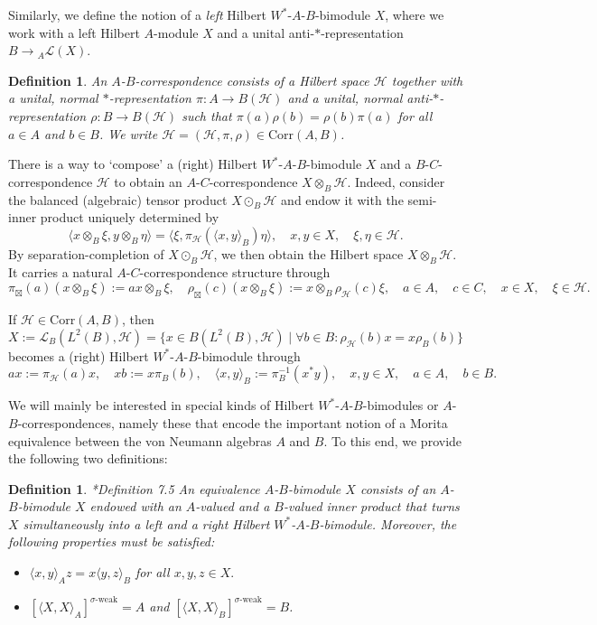 \documentclass[reqno]{amsart}
\numberwithin{equation}{section}
\newtheorem{Def}[Theorem]{Definition}
\newcommand{\Corr}{\mathrm{Corr}}
\begin{document}
Similarly, we define the notion of a \emph{left} Hilbert $W^*$-$A$-$B$-bimodule $X$, where we work with a left Hilbert $A$-module $X$ and a unital anti-$*$-representation $B \to {}_A\mathscr{L}(X)$.

\begin{Def}\cite{Con80+}\label{correspondence_definition}
    An $A$-$B$-correspondence consists of a Hilbert space $\mathcal{H}$ together with a unital, normal $*$-representation $\pi: A \to B(\mathcal{H})$ and a unital, normal anti-$*$-representation $\rho: B \to B(\mathcal{H})$ such that $\pi(a)\rho(b) = \rho(b)\pi(a)$ for all $a\in A$ and $b\in B$. We write $\mathcal{H}= (\mathcal{H}, \pi, \rho)\in \Corr(A,B)$.
\end{Def}

There is a way to `compose' a (right) Hilbert $W^*$-$A$-$B$-bimodule $X$ and a $B$-$C$-correspondence $\mathcal{H}$ to obtain an $A$-$C$-correspondence $X \otimes_B \mathcal{H}$. Indeed, consider the balanced (algebraic) tensor product $X \odot_B\mathcal{H}$ and endow it with the semi-inner product uniquely determined by
$$\langle x\otimes_B \xi, y \otimes_B \eta\rangle = \langle \xi, \pi_\mathcal{H}(\langle x,y\rangle_B)\eta\rangle, \quad x,y \in X, \quad \xi, \eta \in \mathcal{H}.$$
By separation-completion of $X\odot_B\mathcal{H}$, we then obtain the Hilbert space $X\otimes_B\mathcal{H}$. It carries a natural $A$-$C$-correspondence structure through
$$\pi_\boxtimes(a)(x\otimes_B \xi):= ax\otimes_B \xi, \quad \rho_\boxtimes(c)(x\otimes_B \xi):=x \otimes_B \rho_\mathcal{H}(c)\xi, \quad a \in A, \quad c\in C, \quad x \in X, \quad \xi \in \mathcal{H}.$$

If $\mathcal{H}\in \Corr(A,B)$, then
$$X:= \mathscr{L}_B(L^2(B), \mathcal{H})= \{x\in B(L^2(B), \mathcal{H})\mid \forall b \in B: \rho_\mathcal{H}(b)x=x\rho_B(b)\}$$ becomes a (right) Hilbert $W^*$-$A$-$B$-bimodule through 
$$ax := \pi_\mathcal{H}(a)x, \quad xb:= x\pi_B(b), \quad \langle x,y\rangle_B := \pi_B^{-1}(x^*y), \quad x,y\in X, \quad a\in A, \quad b\in B.$$

We will mainly be interested in special kinds of Hilbert $W^*$-$A$-$B$-bimodules or $A$-$B$-correspondences, namely these that encode the important notion of a Morita equivalence between the von Neumann algebras $A$ and $B$.  To this end, we provide the following two definitions:

\begin{Def}\label{equivalence bimodule} \cite{Rie74}*{Definition 7.5}
    An equivalence $A$-$B$-bimodule $X$ consists of an $A$-$B$-bimodule $X$ endowed with an $A$-valued and a $B$-valued inner product that turns $X$ simultaneously into a left and a right Hilbert $W^*$-$A$-$B$-bimodule. Moreover, the following properties must be satisfied:
\begin{itemize}\setlength\itemsep{-0.5em}
    \item $\langle x,y\rangle_A z= x \langle y,z\rangle_B$ for all $x,y,z\in X.$
    \item $[\langle X,X\rangle_A]^{\sigma\text{-weak}}= A$ and $[\langle X,X\rangle_B]^{\sigma\text{-weak}}= B$.
\end{itemize}
\end{Def}
\end{document}
